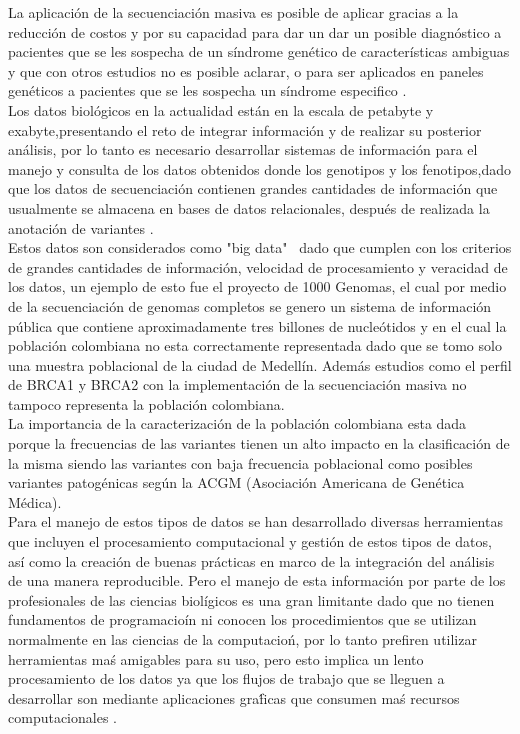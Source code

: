 La aplicación de la secuenciación masiva es posible de aplicar gracias a  la reducción de costos y por su capacidad para dar un dar un posible diagnóstico a pacientes que se les sospecha de un síndrome genético de características ambiguas y que con otros estudios no es posible aclarar, o para ser aplicados en paneles genéticos a pacientes que se les sospecha un síndrome especifico \cite{Hegde2017}.\\

Los datos biológicos en la actualidad están en la escala de petabyte y exabyte,presentando el reto de integrar información  y de realizar su posterior análisis, por lo tanto es necesario desarrollar sistemas de información para el manejo y consulta de los datos obtenidos donde los genotipos y los fenotipos,dado que los datos de secuenciación contienen grandes cantidades de información que usualmente se almacena en bases de datos relacionales, después de realizada la anotación de variantes \cite{Li2014} \cite{Lauzon2016}.\\

Estos datos son considerados como "big data" \ dado que cumplen con los criterios de grandes cantidades de información, velocidad de procesamiento y veracidad de los datos, un ejemplo de esto fue el proyecto de 1000 Genomas, el cual por medio de la secuenciación de genomas completos se genero un sistema de información pública que contiene aproximadamente tres billones de nucleótidos y en el cual la población colombiana no esta correctamente representada dado que se tomo solo una muestra poblacional de la ciudad de Medellín. Además estudios como el perfil de BRCA1 y BRCA2 con la implementación de la secuenciación masiva no tampoco representa la población  colombiana\cite{Li2014,CoriellInstitute,Arias-blanco2015}.\\
 
La importancia de la caracterización de la población colombiana esta dada porque la frecuencias de las variantes tienen un alto impacto en la clasificación de la misma siendo las variantes con baja frecuencia poblacional como posibles variantes patogénicas según la ACGM (Asociación Americana de Genética Médica)\cite{Li2017}.\\

Para el manejo de estos tipos de datos se han desarrollado diversas herramientas que incluyen el procesamiento computacional y gestión de estos tipos de datos, así como la creación de buenas prácticas en marco de la integración del análisis de una manera reproducible. Pero el manejo de esta informaci\'on por parte de los profesionales de las ciencias biol\'igicos es una gran limitante dado que no tienen fundamentos de programacio\'in ni conocen los procedimientos que se utilizan normalmente en las ciencias de la computacio\'n, por lo tanto prefiren utilizar herramientas ma\'s amigables para su uso, pero esto implica un lento procesamiento de los datos ya que los flujos de trabajo que se lleguen a desarrollar son mediante aplicaciones gra\'ficas que consumen ma\'s recursos computacionales \cite{Fisch2015}.\\

